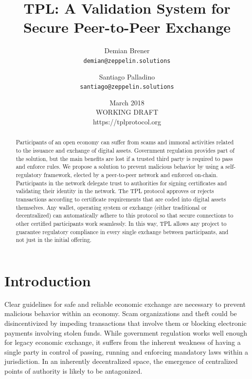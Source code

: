 \documentclass[10pt]{article}
\begin{document}
\title{TPL: A Validation System for Secure Peer-to-Peer Exchange}

\author{
  Demian Brener\\
  \texttt{demian@zeppelin.solutions}
  \and
  Santiago Palladino\\
  \texttt{santiago@zeppelin.solutions}
}
\date{March 2018 \\ WORKING DRAFT \\ \small https://tplprotocol.org}
\maketitle
\begin{abstract}

\noindent Participants of an open economy can suffer from scams and immoral activities related to the issuance and exchange of digital assets. Government regulation provides part of the solution, but the main benefits are lost if a trusted third party is required to pass and enforce rules. We propose a solution to prevent malicious behavior by using a self-regulatory framework, elected by a peer-to-peer network and enforced on-chain. Participants in the network delegate trust to authorities for signing certificates and validating their identity in the network. The TPL protocol approves or rejects transactions according to certificate requirements that are coded into digital assets themselves. Any wallet, operating system or exchange (either traditional or decentralized) can automatically adhere to this protocol so that secure connections to other certified participants work seamlessly. In this way, TPL allows any project to guarantee regulatory compliance in every single exchange between participants, and not just in the initial offering. \\

\end{abstract}
\section{Introduction}

Clear guidelines for safe and reliable economic exchange are necessary to prevent malicious behavior within an economy. Scam organizations and theft could be disincentivized by impeding transactions that involve them or blocking electronic payments involving stolen funds. While government regulation works well enough for legacy economic exchange, it suffers from the inherent weakness of having a single party in control of passing, running and enforcing mandatory laws within a jurisdiction. In an inherently decentralized space, the emergence of centralized points of authority is likely to be antagonized.\\
\end{document}
